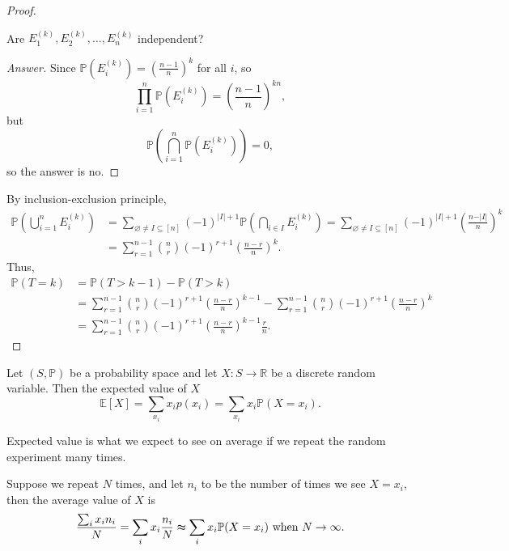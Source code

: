 \begin{proof}
\begin{question}
        Are \(E_1^{(k)}, E_2^{(k)}, \dots , E_n^{(k)}\) independent? 
    \end{question}
    \begin{proof}[Answer]
        Since \(\mathbb{P} \left( E_i^{(k)} \right) = \left( \frac{n-1}{n} \right)^k\) for all \(i\), so
        \[
            \prod _{i=1}^n \mathbb{P} (E_i^{(k)}) = \left( \frac{n-1}{n} \right)^{kn},
        \] but
        \[
            \mathbb{P} \left( \bigcap_{i=1}^{n} \mathbb{P} (E_i^{(k)})  \right) = 0, 
        \]
        so the answer is no.
    \end{proof}
    By inclusion-exclusion principle,
    \begin{align*}
        \mathbb{P} \left( \bigcup_{i=1}^{n} E_i^{(k)}  \right) &= \sum_{\varnothing \neq I \subseteq [n]} (-1)^{\vert I \vert + 1} \mathbb{P} \left( \bigcap_{i \in I} E_i^{(k)}  \right) = \sum_{\varnothing \neq I \subseteq [n]} (-1)^{\vert I \vert  + 1} \left( \frac{n - \vert I \vert }{n} \right)^k \\
        &= \sum_{r=1}^{n-1} \binom{n}{r} (-1)^{r+1} \left( \frac{n-r}{n} \right)^k. 
    \end{align*}
    Thus, 
    \begin{align*}
        \mathbb{P} (T = k) &= \mathbb{P} (T > k - 1) - \mathbb{P} (T > k) \\
        &= \sum_{r=1}^{n-1} \binom{n}{r} (-1)^{r+1} \left( \frac{n-r}{n} \right)^{k-1} - \sum_{r=1}^{n-1} \binom{n}{r} (-1)^{r+1} \left( \frac{n-r}{n} \right)^k \\
        &= \sum_{r=1}^{n-1} \binom{n}{r} (-1)^{r+1} \left( \frac{n-r}{n} \right)^{k-1} \frac{r}{n}.    
    \end{align*}
    

\end{proof}

\begin{definition}
    Let \((S, \mathbb{P})\) be a probability space and let \(X: S \to \mathbb{R} \) be a discrete random variable. Then the expected value of \(X\) 
    \[
        \mathbb{E} [X] = \sum_{x_i} x_i p(x_i) = \sum_{x_i} x_i \mathbb{P} (X = x_i).  
    \]  
\end{definition}

\begin{remark}
    Expected value is what we expect to see on average if we repeat the random experiment many times.
\end{remark}

Suppose we repeat \(N\) times, and let \(n_i\) to be the number of times we see \(X = x_i\), then the average value of \(X\) is 
\[
    \frac{\sum_{i} x_i n_i }{N} = \sum_{i} x_i \frac{n_i}{N} \thickapprox \sum_{i} x_i \mathbb{P} (X = x_i) \text{ when } N \to \infty .   
\]    

